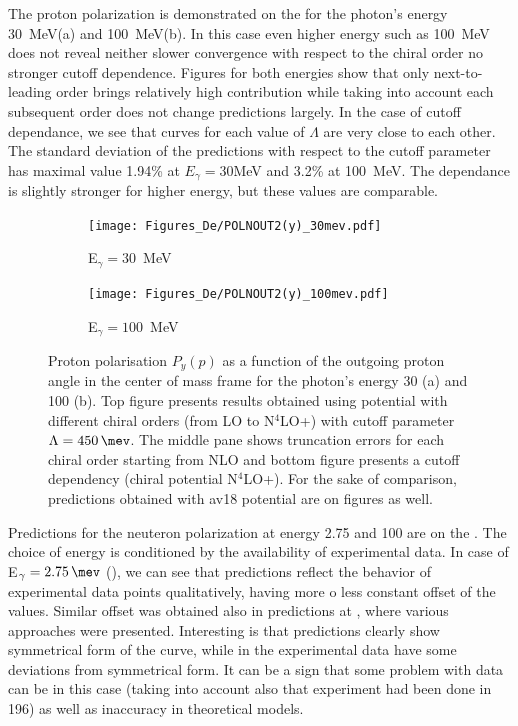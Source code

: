     The proton polarization is demonstrated on the  for the 
    photon's energy 30~MeV(a) and 100~MeV(b). In this case even higher energy
    such as 100~MeV does not reveal neither
    slower convergence with respect to the chiral order no
    stronger cutoff dependence. Figures for both energies show
    that only next-to-leading order brings relatively high contribution
    while taking into account each subsequent order does not change predictions
    largely. In the case of cutoff dependance, we see that curves for each
    value of $\Lambda$ are very close to each other. 
    The standard deviation of the predictions with respect to the cutoff parameter
    has maximal value 1.94\% at $E_\gamma = 30$MeV and 3.2\% at 100~MeV.
    The dependance is slightly stronger for higher energy, but these values are comparable.


    \begin{figure}[h]
        \centering
        \begin{subfigure}[b]{0.46\textwidth}
            \texttt{[image: Figures\_De/POLNOUT2(y)\_30mev.pdf]}
            \caption{\small E$_\gamma = 30$~MeV}
            \label{PY_30_vert}
        \end{subfigure}
        \begin{subfigure}[b]{0.46\textwidth}
            \texttt{[image: Figures\_De/POLNOUT2(y)\_100mev.pdf]}
            \caption{\small E$_\gamma = 100$~MeV}
            \label{PY_100_vert}
        \end{subfigure}
        \caption{Proton polarisation $P_y(p)$ 
        \label{PY_30_100_vert}
        as a function of the outgoing proton angle in the center of mass frame 
        for the photon's energy \SI{30}{\mev} (a) and \SI{100}{\mev} (b).
        Top figure presents results obtained using potential
        with different chiral orders (from LO to N$^4$LO+) with cutoff parameter $\Lambda=\SI{450}{\mev}$.
        The middle pane shows truncation errors for each 
        chiral order starting from NLO and
        bottom figure presents a cutoff dependency (chiral potential N$^4$LO+).
        For the sake of comparison, predictions obtained with \gls*{av18} potential are on  figures as well.}
    \end{figure}


    Predictions for the neuteron polarization at energy \SI{2.75}{\mev} and \SI{100}{\mev} are on the
    . The choice of energy is conditioned by the availability of experimental data.
    In case of E$_\gamma = \SI{2.75}{\mev}$ (), we can see that predictions reflect
    the behavior of experimental data points qualitatively,
    having more o less constant offset of the values. Similar offset was obtained
    also in predictions at \cite{ArenhovelPhotodisint1991}, where various approaches were presented.
    Interesting is that predictions clearly show symmetrical form of the curve, while in the experimental data
    have some deviations from symmetrical form. It can be a sign that some problem with data can be
    in this case (taking into account also that experiment had been done in 196) as well 
    as inaccuracy in theoretical models.

